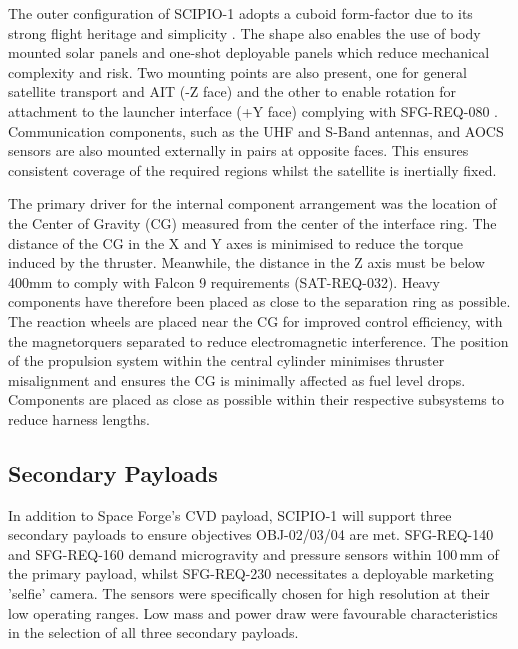 \documentclass[a4paper, 11pt, conference]{IEEEtran}
\begin{document}
The outer configuration of SCIPIO-1 adopts a cuboid form-factor due to its strong flight heritage and simplicity \cite{StarfishSpace2024}. The shape also enables the use of body mounted solar panels and one-shot deployable panels which reduce mechanical complexity and risk. Two mounting points are also present, one for general satellite transport and AIT\label{nom:ait} (-Z face) and the other to enable rotation for attachment to the launcher interface (+Y face) complying with SFG-REQ-080 . Communication components, such as the UHF and S-Band antennas, and AOCS sensors are also mounted externally in pairs at opposite faces. This ensures consistent coverage of the required regions whilst the satellite is inertially fixed.

The primary driver for the internal component arrangement was the location of the Center of Gravity (CG) measured from the center of the interface ring. The distance of the CG in the X and Y axes is minimised to reduce the torque induced by the thruster. Meanwhile, the distance in the Z axis must be below 400mm to comply with Falcon 9 requirements (SAT-REQ-032). Heavy components have therefore been placed as close to the separation ring as possible. The reaction wheels are placed near the CG for improved control efficiency, with the magnetorquers separated to reduce electromagnetic interference. The position of the propulsion system within the central cylinder minimises thruster misalignment and ensures the CG is minimally affected as fuel level drops. Components are placed as close as possible within their respective subsystems to reduce harness lengths.

\subsection{Secondary Payloads}
In addition to Space Forge's CVD payload, SCIPIO-1 will support three secondary payloads to ensure objectives OBJ-02/03/04 are met. SFG-REQ-140 and SFG-REQ-160 demand microgravity and pressure sensors within 100\,mm of the primary payload, whilst SFG-REQ-230 necessitates a deployable marketing 'selfie' camera. The sensors were specifically chosen for high resolution at their low operating ranges. Low mass and power draw were favourable characteristics in the selection of all three secondary payloads.
\end{document}
